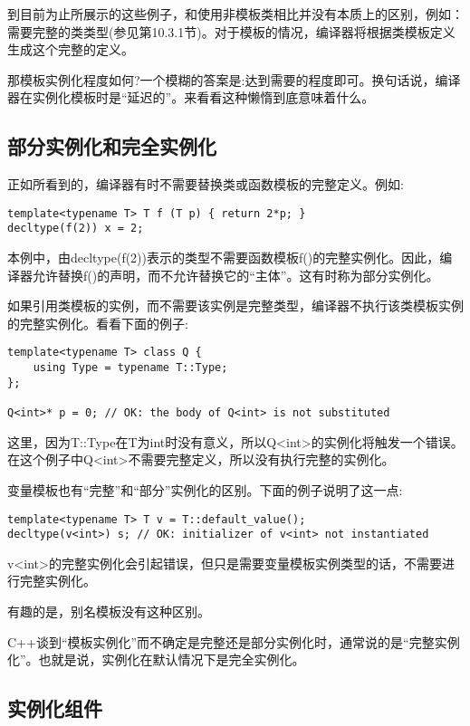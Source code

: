 
到目前为止所展示的这些例子，和使用非模板类相比并没有本质上的区别，例如：需要完整的类类型(参见第10.3.1节)。对于模板的情况，编译器将根据类模板定义生成这个完整的定义。

那模板实例化程度如何?一个模糊的答案是:达到需要的程度即可。换句话说，编译器在实例化模板时是“延迟的”。来看看这种懒惰到底意味着什么。

\subsection{部分实例化和完全实例化}

正如所看到的，编译器有时不需要替换类或函数模板的完整定义。例如:

\begin{lstlisting}[style=styleCXX]
template<typename T> T f (T p) { return 2*p; }
decltype(f(2)) x = 2;
\end{lstlisting}

本例中，由decltype(f(2))表示的类型不需要函数模板f()的完整实例化。因此，编译器允许替换f()的声明，而不允许替换它的“主体”。这有时称为部分实例化。

如果引用类模板的实例，而不需要该实例是完整类型，编译器不执行该类模板实例的完整实例化。看看下面的例子:

\begin{lstlisting}[style=styleCXX]
template<typename T> class Q {
	using Type = typename T::Type;
};

Q<int>* p = 0; // OK: the body of Q<int> is not substituted
\end{lstlisting}

这里，因为T::Type在T为int时没有意义，所以Q<int>的实例化将触发一个错误。在这个例子中Q<int>不需要完整定义，所以没有执行完整的实例化。

变量模板也有“完整”和“部分”实例化的区别。下面的例子说明了这一点:

\begin{lstlisting}[style=styleCXX]
template<typename T> T v = T::default_value();
decltype(v<int>) s; // OK: initializer of v<int> not instantiated
\end{lstlisting}

v<int>的完整实例化会引起错误，但只是需要变量模板实例类型的话，不需要进行完整实例化。

有趣的是，别名模板没有这种区别。

C++谈到“模板实例化”而不确定是完整还是部分实例化时，通常说的是“完整实例化”。也就是说，实例化在默认情况下是完全实例化。

\subsection{实例化组件}

